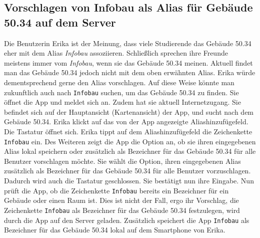 \subsection{Vorschlagen von Infobau als Alias für Gebäude 50.34 auf dem Server}

Die Benutzerin Erika ist der Meinung, dass viele Studierende das Gebäude 50.34 eher mit dem Alias \textit{Infobau} assoziieren.
Schließlich sprechen ihre Freunde meistens immer vom \textit{Infobau}, wenn sie das Gebäude 50.34 meinen.
Aktuell findet man das Gebäude 50.34 jedoch nicht mit dem oben erwähnten Alias.
Erika würde dementsprechend gerne den Alias vorschlagen.
Auf diese Weise könnte man zukunftlich auch nach \texttt{Infobau} suchen, um das Gebäude 50.34 zu finden.
Sie öffnet die App und meldet sich an.
Zudem hat sie aktuell Internetzugang.
Sie befindet sich auf der Hauptansicht (Kartenansicht) der App, und sucht nach dem Gebäude 50.34.
Erika klickt auf das von der App angezeigte Aliashinzufügefeld. 
Die Tastatur öffnet sich.
Erika tippt auf dem Aliashinzufügefeld die Zeichenkette \texttt{Infobau} ein.
Des Weiteren zeigt die App die Option an, ob sie ihren eingegebenen Alias lokal speichern oder zusätzlich als Bezeichner für das Gebäude 50.34 für alle Benutzer vorschlagen möchte.
Sie wählt die Option, ihren eingegebenen Alias zusätzlich als Bezeichner für das Gebäude 50.34 für alle Benutzer vorzuschlagen. 
Dadurch wird auch die Tastatur geschlossen. 
Sie bestätigt nun ihre Eingabe. 
Nun prüft die App, ob die Zeichenkette \texttt{Infobau} bereits ein Bezeichner für ein Gebäude oder einen Raum ist. 
Dies ist nicht der Fall, ergo ihr Vorschlag, die Zeichenkette \texttt{Infobau} als Bezeichner für das Gebäude 50.34 festzulegen, wird durch die App auf den Server geladen. 
Zusätzlich speichert die App \texttt{Infobau} als Bezeichner für das Gebäude 50.34 lokal auf dem Smartphone von Erika.